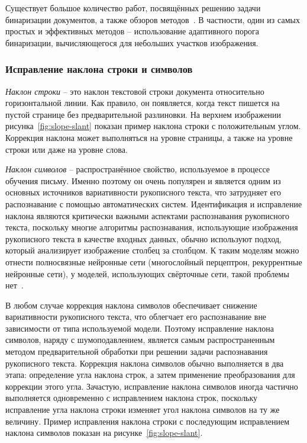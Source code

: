 Существует большое количество работ, посвящённых решению задачи бинаризации документов, а также обзоров методов~\cite{mustafa2018binarization}.
В частности, один из самых простых и эффективных методов -- использование адаптивного порога бинаризации, вычисляющегося для небольших участков изображения.


\subsubsection{Исправление наклона строки и символов}
\label{subsubsec:slope-slant-correction}

\textit{Наклон строки} -- это наклон текстовой строки документа относительно горизонтальной линии.
Как правило, он появляется, когда текст пишется на пустой странице без предварительной разлиновки.
На верхнем изображении рисунка~\ref{fig:slope-slant} показан пример наклона строки с положительным углом.
Коррекция наклона может выполняться на уровне страницы, а также на уровне строки или даже на уровне слова.

\textit{Наклон символов} -- распространённое свойство, используемое в процессе обучения письму.
Именно поэтому он очень популярен и является одним из основных источников вариативности рукописного текста,
что затрудняет его распознавание с помощью автоматических систем.
Идентификация и исправление наклона являются критически важными аспектами распознавания рукописного текста,
поскольку многие алгоритмы распознавания, использующие изображения рукописного текста в качестве входных данных,
обычно используют подход, который анализирует изображение столбец за столбцом.
К таким моделям можно отнести полносвязные нейронные сети (многослойный перцептрон, рекуррентные нейронные сети),
у моделей, использующих свёрточные сети, такой проблемы нет~\cite{sueiras2021continuous}.

В любом случае коррекция наклона символов обеспечивает снижение вариативности рукописного текста,
что облегчает его распознавание вне зависимости от типа используемой модели.
Поэтому исправление наклона символов, наряду с шумоподавлением, является самым распространенным методом предварительной обработки при решении задачи распознавания рукописного текста.
Коррекция наклона символов обычно выполняется в два этапа: определение угла наклона строк, а затем применение преобразования для коррекции этого угла.
Зачастую, исправление наклона символов иногда частично выполняется одновременно с исправлением наклона строк,
поскольку исправление угла наклона строки изменяет угол наклона символов на ту же величину.
Пример исправления наклона строки с последующим исправлением наклона символов показан на рисунке~\ref{fig:slope-slant}.

